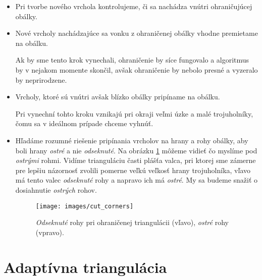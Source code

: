 \begin{itemize}
    \item{
        Pri tvorbe nového vrchola kontrolujeme, či sa nachádza vnútri ohraničujúcej obálky.
    }
    \item{
        Nové vrcholy nachádzajúce sa vonku z ohraničenej obálky vhodne premietame na obálku.

        Ak by sme tento krok vynechali, ohraničenie by síce fungovalo a algoritmus by v nejakom
        momente skončil, avšak ohraničenie by nebolo presné a vyzeralo by neprirodzene.
    }
    \item{
        Vrcholy, ktoré sú vnútri avšak blízko obálky pripíname na obálku.

        Pri vynechní tohto kroku vznikajú pri okraji veľmi úzke a malé trojuholníky, čomu 
        sa v ideálnom prípade chceme vyhnúť.
    }
    \item{
        Hľadáme rozumné riešenie pripínania vrcholov na hrany a rohy obálky, aby boli hrany 
        \textit{ostré} 
        a nie \textit{odseknuté}. Na obrázku \ref{obr:cut_corners} môžeme vidieť čo myslíme pod 
        \textit{ostrými} rohmi. Vidíme trianguláciu časti plášťa valca, pri ktorej sme zámerne pre
        lepšiu názornosť zvolili
        pomerne veľkú veľkosť hrany trojuholníka, vľavo má tento valec 
        \textit{odseknuté} rohy a napravo ich má \textit{ostré}. My sa budeme snažiť o dosiahnutie
        \textit{ostrých} rohov.

        \begin{figure}
            \centerline{\texttt{[image: images/cut\_corners]}}
            \caption[\textit{Ostré} a \textit{odseknuté} rohy pri ohraničenej triangulácii]
            {\textit{Odseknuté} rohy pri ohraničenej triangulácii (vľavo), \textit{ostré} rohy (vpravo).}
            \label{obr:cut_corners}
        \end{figure}
    }
\end{itemize}

\section{Adaptívna triangulácia}

